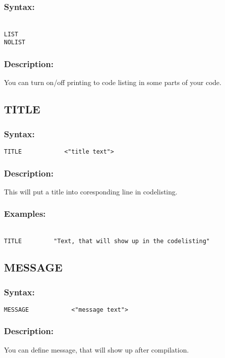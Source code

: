         \subsubsection{Syntax:}
        {
            ~\\
            \usecodefont 
            \verb'LIST'\\
            \verb'NOLIST'
        }
        \subsubsection{Description:}
        You can turn on/off printing to code listing in some parts of your code.

    \subsection{TITLE}
        \subsubsection{Syntax:}
            \verb'TITLE            <"title text">'

        \subsubsection{Description:}
        This will put a title into coresponding line in codelisting.  

        \subsubsection{Examples:}
            {
                ~\\
                \usecodefont
                \verb'TITLE         "Text, that will show up in the codelisting"'
            }

    \subsection{MESSAGE}
        \subsubsection{Syntax:}
            \verb'MESSAGE            <"message text">'

        \subsubsection{Description:}
            You can define message, that will show up after compilation.  

